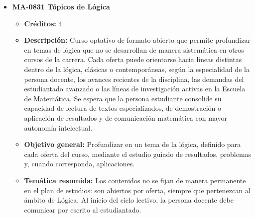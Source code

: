 \begin{itemize}[leftmargin=1.3em, itemsep=10pt, topsep=4pt, label={\color{Azul-UCR}$\blacksquare$}]
\item {\color{Azul-UCR}\textbf{MA-0831 Tópicos de Lógica}}\par\nopagebreak\smallskip
\begin{itemize}[leftmargin=1.1em, itemsep=3pt, topsep=2pt, parsep=2pt, label={\textendash}]
\item \textbf{Créditos:} 4.
\item \textbf{Descripción:} Curso optativo de formato abierto que permite profundizar en temas de lógica que no se desarrollan de manera sistemática en otros cursos de la carrera. Cada oferta puede orientarse hacia líneas distintas dentro de la lógica, clásicas o contemporáneas, según la especialidad de la persona docente, los avances recientes de la disciplina, las demandas del estudiantado avanzado o las líneas de investigación activas en la Escuela de Matemática. Se espera que la persona estudiante consolide su capacidad de lectura de textos especializados, de demostración o aplicación de resultados y de comunicación matemática con mayor autonomía intelectual.
\item \textbf{Objetivo general:} Profundizar en un tema de la lógica, definido para cada oferta del curso, mediante el estudio guiado de resultados, problemas y, cuando corresponda, aplicaciones.
\item \textbf{Temática resumida:} Los contenidos no se fijan de manera permanente en el plan de estudios: son abiertos por oferta, siempre que pertenezcan al ámbito de Lógica. Al inicio del ciclo lectivo, la persona docente debe comunicar por escrito al estudiantado.
\end{itemize}


\end{itemize}
